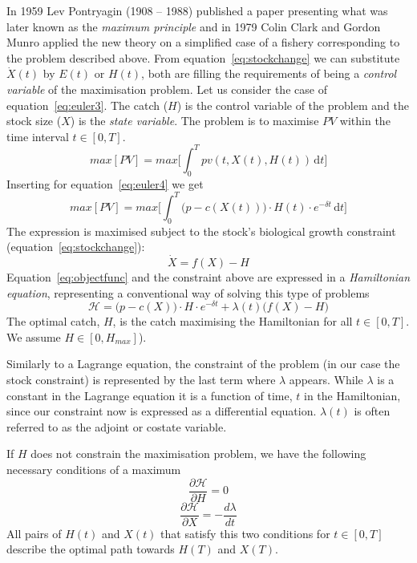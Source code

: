 \documentclass[11pt,fleqn]{book} %
\begin{document}
In 1959 Lev Pontryagin (1908 -- 1988) published a paper presenting what was later known as the \textit{maximum principle}\cite{Desoer1961} and in 1979 Colin Clark and Gordon Munro applied the new theory on a simplified case of a fishery\cite{Clark1975} corresponding to the problem described above. From equation~\ref{eq:stockchange} we can substitute $\dot{X}(t)$ by $E(t)$ or $H(t)$, both are filling the requirements of being a \textit{control variable} of the maximisation problem. Let us consider the case of equation~\ref{eq:euler3}. The catch ($H$) is the control variable of the problem and the stock size ($X$) is the \textit{state variable}. The problem is to maximise $PV$ within the time interval $t \in [0, T]$.
\begin{equation} 
\label{eq:maxprinciple1}
max[PV] = max\Big[\int_{0}^{T} pv(t,X(t),H(t)) \, \mathrm{d}t \Big]
\end{equation}
Inserting for equation~\ref{eq:euler4} we get
\begin{equation} 
\label{eq:objectfunc}
max[PV] = max\Big[\int_{0}^{T} \Big(p - c(X(t)) \Big) \cdot H(t) \cdot e^{-\delta t} \, \mathrm{d}t \Big]
\end{equation}
The expression is maximised subject to the stock's biological growth constraint (equation~\ref{eq:stockchange}):
\begin{equation*} 
\dot{X} = f(X) - H
\end{equation*}
Equation~\ref{eq:objectfunc} and the constraint above are expressed in a \textit{Hamiltonian equation}, representing a conventional way of solving this type of problems
\begin{equation} 
\label{eq:hamiltonian}
\mathcal{H} = \Big(p - c(X) \Big) \cdot H \cdot e^{-\delta t} + \lambda(t) \big( f(X) - H\big)
\end{equation}
The optimal catch, $H$, is the catch maximising the Hamiltonian for all $t \in [0, T]$. We assume $H \in [0, H_{max}]$). 

Similarly to a Lagrange equation, the constraint of the problem (in our case the stock constraint) is represented by the last term where $\lambda$ appears. While $\lambda$ is a constant in the Lagrange equation it is a function of time, $t$ in the Hamiltonian, since our constraint now is expressed as a differential equation. $\lambda(t)$ is often referred to as the adjoint or costate variable\cite{Clark1975}. 

If $H$ does not constrain the maximisation problem, we have the following necessary conditions of a maximum
\begin{equation} 
\label{eq:optcondition1}
\frac{\partial \mathcal{H}}{\partial H} = 0
\end{equation}\begin{equation} 
\label{eq:optcondition2}
\frac{\partial \mathcal{H}}{\partial X} = - \frac{d \lambda}{d t}
\end{equation}
All pairs of $H(t)$ and $X(t)$ that satisfy this two conditions for $t \in [0, T]$ describe the optimal path towards $H(T)$ and $X(T)$.
\end{document}
